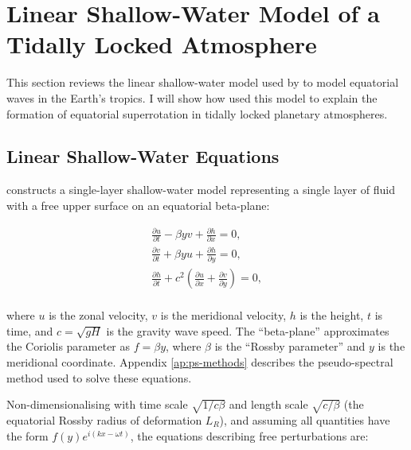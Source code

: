 
\section{Linear Shallow-Water Model of a Tidally Locked Atmosphere}\label{sec:lin-sw-model}

This section reviews the linear shallow-water model used by \citet{matsuno1966quasi} to model equatorial waves in the Earth's tropics. I will show how \citet{showman2011superrotation} used this model to explain the formation of equatorial superrotation in tidally locked planetary atmospheres.

\subsection{Linear Shallow-Water Equations}

\citet{matsuno1966quasi} constructs a single-layer shallow-water model representing a single layer of fluid with a free upper surface on an equatorial beta-plane:

\begin{equation}\label{eqn:sw-eqns-1}
  \begin{gathered}
     \frac{\partial u}{\partial t} - \beta y v +\frac{\partial h}{\partial x} = 0, \\
      \frac{\partial v}{\partial t} + \beta y u + \frac{\partial h}{\partial y} = 0, \\
    \frac{\partial h}{\partial t} +c^{2}(\frac{\partial u}{\partial x} + \frac{\partial v}{\partial y}) =0, \\
  \end{gathered}
\end{equation}

where $u$ is the zonal velocity, $v$ is the meridional velocity, $h$ is the height, $t$ is time, and $c = \sqrt{gH}$ is the gravity wave speed. The ``beta-plane'' approximates the Coriolis parameter as $f=\beta y$, where $\beta$ is the ``Rossby parameter'' and $y$ is the meridional coordinate. Appendix \ref{ap:ps-methods} describes the pseudo-spectral method used to solve these equations.

Non-dimensionalising with time scale $\sqrt{1/c \beta}$ and length scale $\sqrt{c/\beta}$ (the equatorial Rossby radius of deformation $L_{R}$), and assuming all quantities have the form $f(y) e^{i( k x-\omega t)}$, the equations describing free perturbations are:

